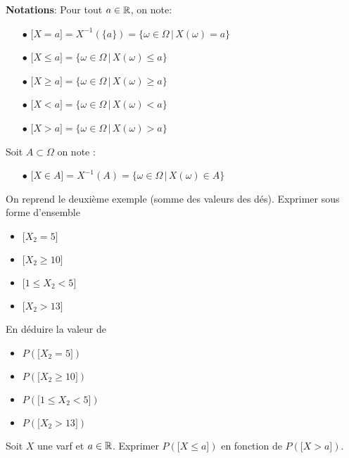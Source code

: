 \documentclass[a4paper, 11pt]{article}
\begin{document}
\begin{tcolorbox}
 \textbf{Notations}: Pour tout $a\in\mathbb{R}$, on note:\vsec
\begin{itemize}
\item[$\bullet$] $\lbrack X=a\rbrack=X^{-1}(\{a\})=\{ \omega \in \Omega \, |\, X(\omega) = a\}$
\item[$\bullet$]  $\lbrack X\leq a\rbrack=\{ \omega \in \Omega \, |\, X(\omega) \leq a\}$
\item[$\bullet$]  $\lbrack X\geq a\rbrack=\{ \omega \in \Omega \, |\, X(\omega) \geq  a\}$
\item[$\bullet$]  $\lbrack X< a\rbrack=\{ \omega \in \Omega \, |\, X(\omega) < a\}$
\item[$\bullet$]  $\lbrack X> a\rbrack=\{ \omega \in \Omega \, |\, X(\omega) > a\}$
\end{itemize}
Soit $A\subset \Omega$ on note :
\begin{itemize}
\item[$\bullet$] $\lbrack X\in A \rbrack=X^{-1}(A)=\{ \omega \in \Omega \, |\, X(\omega) \in A\}$
\end{itemize}   
\end{tcolorbox}
 

\begin{exemple} 
On reprend le deuxi\`eme exemple (somme des valeurs des dés). Exprimer sous forme d'ensemble 
\begin{itemize}
    \item $\lbrack X_2=5\rbrack$
    \item $\lbrack X_2 \geq 10 \rbrack$
    \item $\lbrack 1\leq X_2< 5\rbrack$
    \item $\lbrack X_2>13\rbrack$
\end{itemize}
En déduire la valeur de 
\begin{itemize}
    \item $P(\lbrack X_2=5\rbrack)$
    \item $P(\lbrack X_2 \geq 10 \rbrack)$
    \item $P(\lbrack 1\leq X_2< 5\rbrack)$
    \item $P(\lbrack X_2>13\rbrack)$
\end{itemize}
\end{exemple}


\begin{exercice} Soit $X$ une varf et $a\in\mathbb{R}$. Exprimer $P(\lbrack X \leq a\rbrack)$ en fonction de  $P(\lbrack X> a\rbrack)$.
\end{exercice}
\vspace{2cm}
\end{document}
